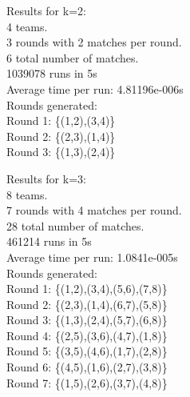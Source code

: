\documentclass[twoside]{article}
\begin{document}
\begin{multicols}{2}
{\color[rgb]{0,0,1}Results for k=2:}\\
\hspace*{5mm} 4 teams.\\
\hspace*{5mm} 3 rounds with 2 matches per round.\\
\hspace*{5mm} 6 total number of matches.\\
\hspace*{5mm} 1039078 runs in 5s\\
\hspace*{5mm} Average time per run: {\color[rgb]{0.7,0.3,0}4.81196e-006s}\\
{\color[rgb]{0,0.5,0}
\hspace*{5mm} Rounds generated:\\
\hspace*{10mm} Round 1: \{(1,2),(3,4)\}\\
\hspace*{10mm} Round 2: \{(2,3),(1,4)\}\\
\hspace*{10mm} Round 3: \{(1,3),(2,4)\}\\
}

{\color[rgb]{0,0,1}Results for k=3:}\\
\hspace*{5mm} 8 teams.\\
\hspace*{5mm} 7 rounds with 4 matches per round.\\
\hspace*{5mm} 28 total number of matches.\\
\hspace*{5mm} 461214 runs in 5s\\
\hspace*{5mm} Average time per run: {\color[rgb]{0.7,0.3,0}1.0841e-005s}\\
{\color[rgb]{0,0.5,0}
\hspace*{5mm} Rounds generated:\\
\hspace*{10mm} Round 1: \{(1,2),(3,4),(5,6),(7,8)\}\\
\hspace*{10mm} Round 2: \{(2,3),(1,4),(6,7),(5,8)\}\\
\hspace*{10mm} Round 3: \{(1,3),(2,4),(5,7),(6,8)\}\\
\hspace*{10mm} Round 4: \{(2,5),(3,6),(4,7),(1,8)\}\\
\hspace*{10mm} Round 5: \{(3,5),(4,6),(1,7),(2,8)\}\\
\hspace*{10mm} Round 6: \{(4,5),(1,6),(2,7),(3,8)\}\\
\hspace*{10mm} Round 7: \{(1,5),(2,6),(3,7),(4,8)\}\\
}


\end{multicols}
\end{document}
